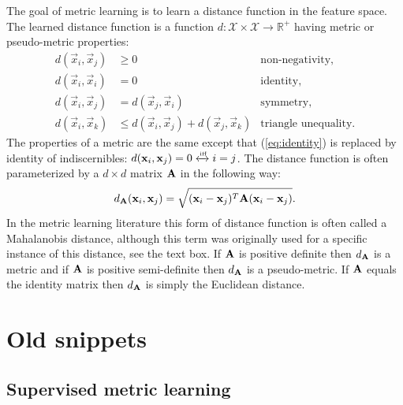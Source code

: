The goal of metric learning is to learn a distance function in the feature space. The learned distance function is a function $d: \mathcal{X} \times \mathcal{X} \rightarrow \mathbb{R}^{+}$ having metric or pseudo-metric properties:
\begin{subequations}
\begin{align}
        d(\vec{x}_i, \vec{x}_j) & \geq 0 &  \text{non-negativity}, \label{eq:non-negativity}\\
        d(\vec{x}_i, \vec{x}_i) & = 0 &  \text{identity}, \label{eq:identity}\\
        d(\vec{x}_i, \vec{x}_j) & = d(\vec{x}_j, \vec{x}_i) &  \text{symmetry}, \label{eq:symmetry}\\
        d(\vec{x}_i, \vec{x}_k) & \leq d(\vec{x}_i, \vec{x}_j) + d(\vec{x}_j, \vec{x}_k) &  \text{triangle unequality}. \label{eq:triangle_unequality}
\end{align}
\end{subequations}
The properties of a metric are the same except that (\ref{eq:identity}) is replaced by identity of indiscernibles: $d(\vec{x}_i, \vec{x}_j) = 0 \xleftrightarrow[]{\text{\tiny{iff}}} i = j$. The distance function is often parameterized by a $d \times d$ matrix $\mat{A}$ in the following way:
\begin{equation}
d_{\mat{A}}(\vec{x}_i, \vec{x}_j) = \sqrt{(\vec{x}_i - \vec{x}_j)^T\mat{A}(\vec{x}_i - \vec{x}_j)}.
\end{equation}
In the metric learning literature this form of distance function is often called a Mahalanobis distance, although this term was originally used for a specific instance of this distance, see the text box. If $\mat{A}$ is positive definite then $d_{\mat{A}}$ is a metric and if $\mat{A}$ is positive semi-definite then $d_{\mat{A}}$ is a pseudo-metric. If $\mat{A}$ equals the identity matrix then $d_{\mat{A}}$ is simply the Euclidean distance.

















\section*{Old snippets}


\subsection{Supervised metric learning}
\label{sec:metric_learning}



